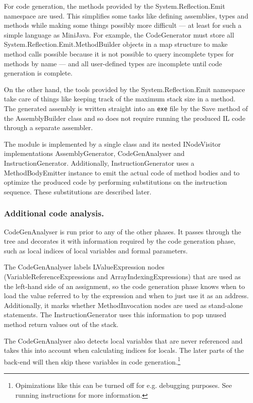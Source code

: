 \documentclass[a4paper,11pt]{article}
\begin{document}
For code generation, the methods provided by the System.Reflection.Emit namespace are used. This simplifies some tasks like defining assemblies, types and methods while making some things possibly more difficult --- at least for such a simple language as MiniJava. For example, the CodeGenerator must store all System.Reflection.Emit.MethodBuilder objects in a map structure to make method calls possible because it is not possible to query incomplete types for methods by name --- and all user-defined types are incomplete until code generation is complete.

On the other hand, the tools provided by the System.Reflection.Emit namespace take care of things like keeping track of the maximum stack size in a method. The generated assembly is written straight into an \verb,exe, file by the Save method of the AssemblyBuilder class and so does not require running the produced IL code through a separate assembler.

The module is implemented by a single class and its nested INodeVisitor implementations AssemblyGenerator, CodeGenAnalyser and InstructionGenerator. Additionally, InstructionGenerator uses a MethodBodyEmitter instance to emit the actual code of method bodies and to optimize the produced code by performing substitutions on the instruction sequence. These substitutions are described later.

\subsubsection{Additional code analysis.}

CodeGenAnalyser is run prior to any of the other phases. It passes through the tree and decorates it with information required by the code generation phase, such as local indices of local variables and formal parameters.

The CodeGenAnalyser labels LValueExpression nodes (VariableReferenceExpressions and ArrayIndexingExpressions) that are used as the left-hand side of an assignment, so the code generation phase knows when to load the value referred to by the expression and when to just use it as an address. Additionally, it marks whether MethodInvocation nodes are used as stand-alone statements. The InstructionGenerator uses this information to pop unused method return values out of the stack.

The CodeGenAnalyser also detects local variables that are never referenced and takes this into account when calculating indices for locals. The later parts of the back-end will then skip these variables in code generation.\footnote{Opimizations like this can be turned off for e.g. debugging purposes. See running instructions for more information.}
\end{document}

